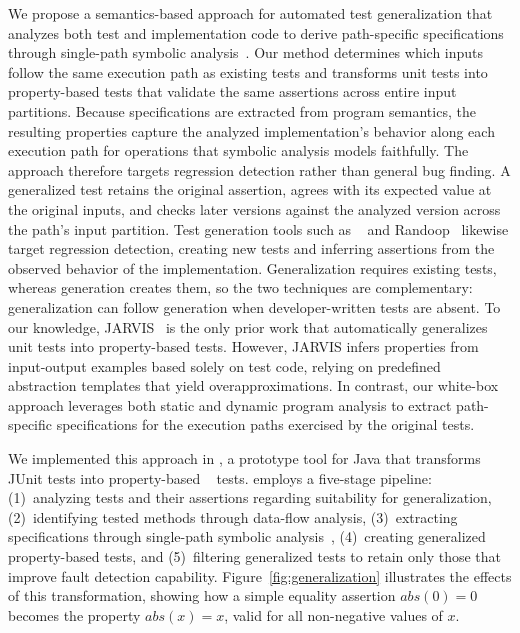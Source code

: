 We propose a semantics-based approach for automated test generalization
that analyzes both test and implementation code
to derive path-specific specifications through single-path symbolic analysis~\cite{pasareanu_2013_symbolic}.
Our method determines which inputs follow the same execution path as existing tests
and transforms unit tests into property-based tests
that validate the same assertions across entire input partitions.
Because specifications are extracted from program semantics,
the resulting properties capture the analyzed implementation's behavior along each execution path
for operations that symbolic analysis models faithfully.
The approach therefore targets regression detection rather than general bug finding.
A generalized test retains the original assertion,
agrees with its expected value at the original inputs,
and checks later versions against the analyzed version across the path's input partition.
Test generation tools such as \ToolEvoSuite{}~\cite{fraser_2011_evosuite} and Randoop~\cite{pacheco_2007_randoop}
likewise target regression detection, creating new tests and inferring assertions from the observed behavior of the implementation.
Generalization requires existing tests, whereas generation creates them,
so the two techniques are complementary:
generalization can follow generation when developer-written tests are absent.
To our knowledge, JARVIS~\cite{peleg_2018_jarvis} is the only prior work
that automatically generalizes unit tests into property-based tests.
However, JARVIS infers properties from input-output examples based solely on test code,
relying on predefined abstraction templates that yield overapproximations.
In contrast, our white-box approach leverages both static and dynamic program analysis
to extract path-specific specifications for the execution paths exercised by the original tests.

We implemented this approach in \ToolTeralizer{}, a prototype tool for Java
that transforms JUnit tests into property-based \ToolJqwik{}~\cite{link_2022_jqwik} tests.
\ToolTeralizer{} employs a five-stage pipeline:
(1)~analyzing tests and their assertions regarding suitability for generalization,
(2)~identifying tested methods through data-flow analysis,
(3)~extracting specifications through single-path symbolic analysis~\cite{pasareanu_2013_symbolic},
(4)~creating generalized property-based tests, and
(5)~filtering generalized tests to retain only those that improve fault detection capability.
Figure~\ref{fig:generalization} illustrates the effects of this transformation,
showing how a simple equality assertion $abs(0) = 0$
becomes the property $abs(x) = x$,
valid for all non-negative values of $x$.

